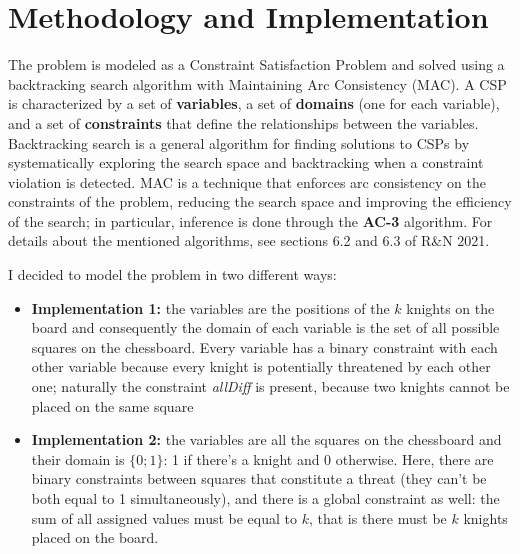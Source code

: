\documentclass[a4paper,12pt]{article}
\begin{document}
\section{Methodology and Implementation}
The problem is modeled as a Constraint Satisfaction Problem and solved using a backtracking search algorithm with Maintaining 
Arc Consistency (MAC). A CSP is characterized by a set of \textbf{variables}, a set of \textbf{domains} (one for each variable), and a set of \textbf{constraints} that
define the relationships between the variables. Backtracking search is a general algorithm for finding solutions to CSPs by systematically exploring the 
search space and backtracking when a constraint violation is detected. MAC is a technique that enforces arc consistency on the
constraints of the problem, reducing the search space and improving the efficiency of the search; in particular, inference
is done through the \textbf{AC-3} algorithm. For details about the mentioned algorithms, see sections 6.2 and 6.3 of R\&N 2021.

I decided to model the problem in two different ways:
\begin{itemize}
    \item \textbf{Implementation 1:} the variables are the positions of the \( k \) knights on the board and consequently the domain of each variable is the set of all possible squares on the chessboard. Every variable has a binary constraint with each other variable because every knight is potentially threatened by each other one; naturally the constraint \textit{allDiff} is present, because two knights cannot be placed on the same square
    
    \item \textbf{Implementation 2:} the variables are all the squares on the chessboard and their domain is $\{0; 1\}$: 1 if there's a knight and 0 otherwise. Here, there are binary constraints between squares that constitute a threat (they can't be both equal to 1 simultaneously), and there is a global constraint as well: the sum of all assigned values must be equal to \( k \), that is there must be \( k \) knights placed on the board. 
\end{itemize}
\end{document}
